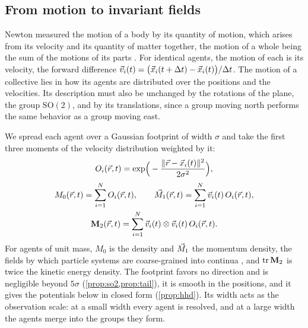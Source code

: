 \documentclass[pdflatex,sn-apa]{sn-jnl}
\begin{document}
\subsection{From motion to invariant fields}
\label{sec:fields}\label{sec:representation}\label{sec:ladder}

Newton measured the motion of a body by its quantity of motion, which arises from its velocity and its quantity of
matter together, the motion of a whole being the sum of the motions of its parts
\citep[Definition~II]{newton1687principia}. For identical agents, the motion of each is its velocity, the forward
difference $\vec{v}_i(t)=\big(\vec{x}_i(t+\Delta t)-\vec{x}_i(t)\big)/\Delta t$. The motion of a collective lies in how its agents
are distributed over the positions and the velocities. Its description must also be unchanged by the rotations of the
plane, the group $\mathrm{SO}(2)$, and by its translations, since a group moving north performs the same behavior as a
group moving east.

We spread each agent over a Gaussian footprint of width $\sigma$ and take the first three moments of the velocity
distribution weighted by it:
\begin{equation}
O_i(\vec{r},t)=\exp\!\Big(-\frac{\|\vec{r}-\vec{x}_i(t)\|^2}{2\sigma^2}\Big),
\label{eq:footprint}
\end{equation}
\begin{equation}
\begin{gathered}
M_0(\vec{r},t)=\sum_{i=1}^N O_i(\vec{r},t),\qquad
\vec{M}_1(\vec{r},t)=\sum_{i=1}^N \vec{v}_i(t)\,O_i(\vec{r},t),\\
\mathbf{M}_2(\vec{r},t)=\sum_{i=1}^N \vec{v}_i(t)\otimes\vec{v}_i(t)\,O_i(\vec{r},t).
\end{gathered}
\label{eq:moments}
\end{equation}
For agents of unit mass, $M_0$ is the density and $\vec{M}_1$ the momentum density, the fields by which particle systems
are coarse-grained into continua \citep{weinhart2012discrete}, and $\operatorname{tr}\mathbf{M}_2$ is twice the kinetic
energy density. The footprint favors no direction and is negligible beyond $5\sigma$ (\cref{prop:so2,prop:tail}), it
is smooth in the positions, and it gives the potentials below in closed form (\cref{prop:hhd}). Its width acts as the observation scale: at a small width every agent is
resolved, and at a large width the agents merge into the groups they form.
\end{document}
